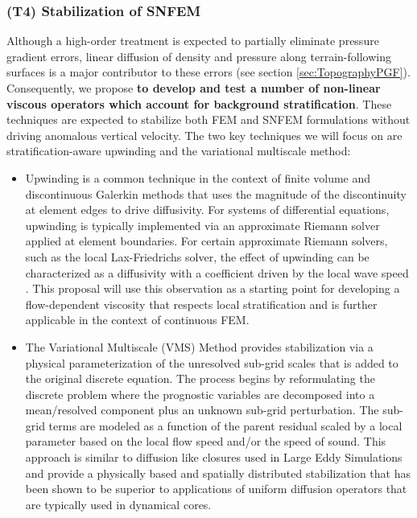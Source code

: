 \documentclass[11pt]{article}
\begin{document}
\subsubsection{(T4) Stabilization of SNFEM}

Although a high-order treatment is expected to partially eliminate pressure gradient errors, linear diffusion of density and pressure along terrain-following surfaces is a major contributor to these errors (see section \ref{sec:TopographyPGF}).  Consequently, we propose \textbf{to develop and test a number of non-linear viscous operators which account for background stratification}.  These techniques are expected to stabilize both FEM and SNFEM formulations without driving anomalous vertical velocity.  The two key techniques we will focus on are stratification-aware upwinding and the variational multiscale method:

\vspace{-0.4cm}
\begin{itemize}
\item Upwinding is a common technique in the context of finite volume and discontinuous Galerkin methods that uses the magnitude of the discontinuity at element edges to drive diffusivity.  For systems of differential equations, upwinding is typically implemented via an approximate Riemann solver applied at element boundaries.  For certain approximate Riemann solvers, such as the local Lax-Friedrichs solver, the effect of upwinding can be characterized as a diffusivity with a coefficient driven by the local wave speed \cite{ullrich2014understanding}.  This proposal will use this observation as a starting point for developing a flow-dependent viscosity that respects local stratification and is further applicable in the context of continuous FEM.

\item The Variational Multiscale (VMS) Method provides stabilization via a physical parameterization of the unresolved sub-grid scales that is added to the original discrete equation. The process begins by reformulating the discrete problem where the prognostic variables are decomposed into a mean/resolved component plus an unknown sub-grid perturbation.  The sub-grid terms are modeled as a function of the parent residual scaled by a local parameter based on the local flow speed and/or the speed of sound. This approach is similar to diffusion like closures used in Large Eddy Simulations and provide a physically based and spatially distributed stabilization that has been shown to be superior to applications of uniform diffusion operators that are typically used in dynamical cores. \cite{hughes1998variational, marras2012variational, marras2013variational}
\end{itemize}
\end{document}
